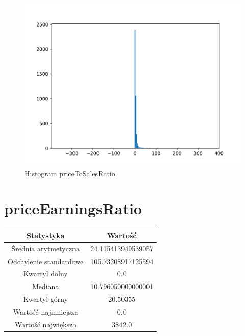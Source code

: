 \documentclass{article}
\begin{document}
\begin{figure}[h!]
    \includegraphics[width=\linewidth]{variables/priceToSalesRatio.png}
    \caption{Histogram priceToSalesRatio }
\end{figure}\section{ priceEarningsRatio }

\begin{center}
    \begin{tabular}{|c | c|} 
    \hline
    Statystyka & Wartość \\
    \hline\hline
    Średnia arytmetyczna & 24.115413949539057 \\ 
    \hline
    Odchylenie standardowe & 105.73208917125594 \\
    \hline
    Kwartyl dolny & 0.0 \\
    \hline
    Mediana & 10.796050000000001 \\
    \hline
    Kwartyl górny & 20.50355 \\
    \hline
    Wartość najmniejsza & 0.0 \\
    \hline
    Wartość największa & 3842.0 \\
    \hline
   \end{tabular}
\end{center}
\end{document}
